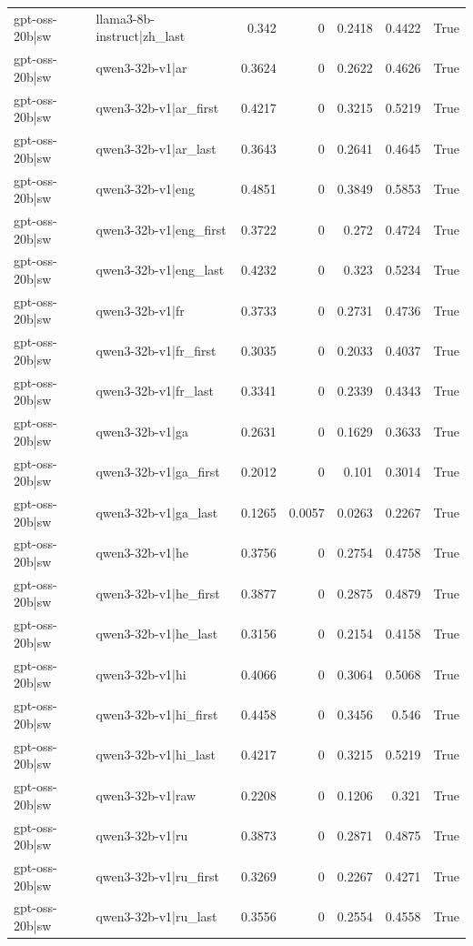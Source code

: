 \begin{table}
\begin{tabular}{l l r r r r l}
gpt-oss-20b|sw & llama3-8b-instruct|zh_last & 0.342 & 0 & 0.2418 & 0.4422 & True \\
gpt-oss-20b|sw & qwen3-32b-v1|ar & 0.3624 & 0 & 0.2622 & 0.4626 & True \\
gpt-oss-20b|sw & qwen3-32b-v1|ar_first & 0.4217 & 0 & 0.3215 & 0.5219 & True \\
gpt-oss-20b|sw & qwen3-32b-v1|ar_last & 0.3643 & 0 & 0.2641 & 0.4645 & True \\
gpt-oss-20b|sw & qwen3-32b-v1|eng & 0.4851 & 0 & 0.3849 & 0.5853 & True \\
gpt-oss-20b|sw & qwen3-32b-v1|eng_first & 0.3722 & 0 & 0.272 & 0.4724 & True \\
gpt-oss-20b|sw & qwen3-32b-v1|eng_last & 0.4232 & 0 & 0.323 & 0.5234 & True \\
gpt-oss-20b|sw & qwen3-32b-v1|fr & 0.3733 & 0 & 0.2731 & 0.4736 & True \\
gpt-oss-20b|sw & qwen3-32b-v1|fr_first & 0.3035 & 0 & 0.2033 & 0.4037 & True \\
gpt-oss-20b|sw & qwen3-32b-v1|fr_last & 0.3341 & 0 & 0.2339 & 0.4343 & True \\
gpt-oss-20b|sw & qwen3-32b-v1|ga & 0.2631 & 0 & 0.1629 & 0.3633 & True \\
gpt-oss-20b|sw & qwen3-32b-v1|ga_first & 0.2012 & 0 & 0.101 & 0.3014 & True \\
gpt-oss-20b|sw & qwen3-32b-v1|ga_last & 0.1265 & 0.0057 & 0.0263 & 0.2267 & True \\
gpt-oss-20b|sw & qwen3-32b-v1|he & 0.3756 & 0 & 0.2754 & 0.4758 & True \\
gpt-oss-20b|sw & qwen3-32b-v1|he_first & 0.3877 & 0 & 0.2875 & 0.4879 & True \\
gpt-oss-20b|sw & qwen3-32b-v1|he_last & 0.3156 & 0 & 0.2154 & 0.4158 & True \\
gpt-oss-20b|sw & qwen3-32b-v1|hi & 0.4066 & 0 & 0.3064 & 0.5068 & True \\
gpt-oss-20b|sw & qwen3-32b-v1|hi_first & 0.4458 & 0 & 0.3456 & 0.546 & True \\
gpt-oss-20b|sw & qwen3-32b-v1|hi_last & 0.4217 & 0 & 0.3215 & 0.5219 & True \\
gpt-oss-20b|sw & qwen3-32b-v1|raw & 0.2208 & 0 & 0.1206 & 0.321 & True \\
gpt-oss-20b|sw & qwen3-32b-v1|ru & 0.3873 & 0 & 0.2871 & 0.4875 & True \\
gpt-oss-20b|sw & qwen3-32b-v1|ru_first & 0.3269 & 0 & 0.2267 & 0.4271 & True \\
gpt-oss-20b|sw & qwen3-32b-v1|ru_last & 0.3556 & 0 & 0.2554 & 0.4558 & True \\

\end{tabular}
\end{table}
